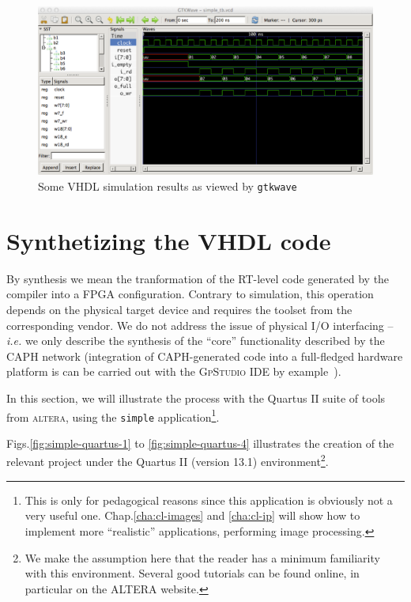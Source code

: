 \begin{figure}[htbp]
  \centering
 \includegraphics[width=\textwidth]{./figs/simple-waves.pdf}
  \caption{Some VHDL simulation results as viewed by \texttt{gtkwave}} 
  \label{fig:simple-waves}
\end{figure}

\section{Synthetizing the VHDL code}
\label{sec:synth-vhdl-code}

By synthesis we mean the tranformation of the RT-level code generated by the \caph compiler into a
FPGA configuration. Contrary to simulation, this operation depends on the physical target device and
requires the toolset from the corresponding vendor.  We do not address the issue of physical I/O
interfacing -- \emph{i.e.} we only describe the synthesis of the ``core'' functionality described by
the CAPH network (integration of CAPH-generated code into a full-fledged hardware platform is can be
carried out with the \textsc{GpStudio} IDE by example~\cite{GpStudio}).

In this section, we will illustrate the process
with the Quartus II suite of tools from \textsc{altera}, using the \verb|simple| application\footnote{This is
  only for pedagogical reasons since this application is obviously not a very useful one.
  Chap.\ref{cha:cl-images} and \ref{cha:cl-ip} will show how to implement more ``realistic'' applications,
  performing image processing.}.

\medskip Figs.\ref{fig:simple-quartus-1} to \ref{fig:simple-quartus-4} illustrates the creation of
the relevant project under the Quartus II (version 13.1) environment\footnote{We make the assumption
  here that the reader has a minimum familiarity with this environment. Several good tutorials can
  be found online, in particular on the ALTERA website.}.

